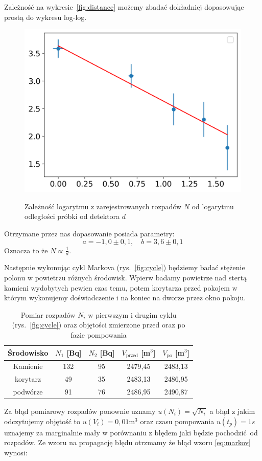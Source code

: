 \documentclass[12pt]{article}
\begin{document}
Zależność na wykresie~\ref{fig:distance} możemy zbadać dokładniej dopasowując prostą do wykresu log-log.
\begin{figure}[H]
	\centering
	\includegraphics[scale=0.7]{distance_log}
	\label{fig:distance_log}
	\caption{Zależność logarytmu z zarejestrowanych rozpadów $N$ od logarytmu odległości próbki od detektora $d$}
\end{figure}
Otrzymane przez nas dopasowanie posiada parametry:
\[
	a = -1{,}0 \pm 0{,}1, \quad b = 3{,}6 \pm 0{,}1
\]
Oznacza to że $N \propto \frac{1}{d}$.


Następnie wykonując cykl Markova (rys.~\ref{fig:cycle}) będziemy badać stężenie polonu w powietrzu różnych środowisk. Wpierw badamy powietrze nad stertą kamieni wydobytych pewien czas temu, potem korytarza przed pokojem w którym wykonujemy doświadczenie i na koniec na dworze przez okno pokoju.
\begin{table}[H]
    \centering
    \begin{tabular}{c|cc|cc}
        \toprule
        Środowisko & $N_1$ [Bq] & $N_2$ [Bq] & $V_{\text{przed}}$ [m$^3$] & $V_{\text{po}}$ [m$^3$] \\
        \midrule
        Kamienie & 132 & 95  & 2479{,}45 & 2483{,}13 \\
        korytarz & 49  & 35  & 2483{,}13 & 2486{,}95 \\
        podwórze & 91  & 76  & 2486{,}95 & 2490{,}87 \\
        \bottomrule
    \end{tabular}
    \caption{Pomiar rozpadów $N_i$ w pierwszym i drugim cyklu (rys.~\ref{fig:cycle}) oraz objętości zmierzone przed oraz po fazie pompowania}
    \label{tab:density_measurments}
\end{table}
Za błąd pomiarowy rozpadów ponownie uznamy $u(N_i) = \sqrt{N_i}$ a błąd z jakim odczytujemy objętość to $u(V_i) = 0{,}01 \text{m}^3$ oraz czasu pompowania $u(t_p) = 1s$ uznajemy za marginalnie mały w porównaniu z błędem jaki będzie pochodzić od rozpadów.
Ze wzoru na propagację błędu otrzmamy że błąd wzoru \eqref{eq:markov} wynosi:
\end{document}
